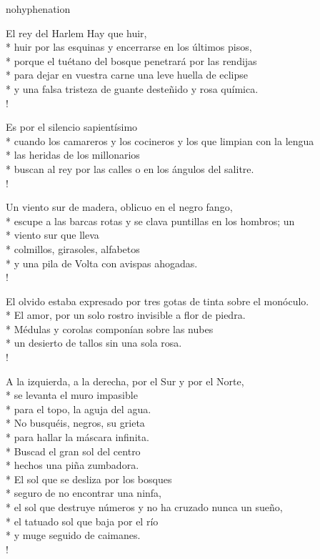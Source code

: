 \documentclass[
    a5paper,
    DIV=10,
    12pt,
    notitlepage,
    oneside,]
{scrbook} %
\begin{document}
\begin{hyphenrules}{nohyphenation}
\begin{poem}{El rey del Harlem}{}{\vspace{-1em}}
Hay que huir,\\*
huir por las esquinas y encerrarse en los últimos pisos,\\*
porque el tuétano del bosque penetrará por las rendijas\\*
para dejar en vuestra carne una leve huella de eclipse\\*
y una falsa tristeza de guante desteñido y rosa química.\\!

\ptspacer

Es por el silencio sapientísimo\\*
cuando los camareros y los cocineros y los que limpian con la lengua\\*
las heridas de los millonarios\\*
buscan al rey por las calles o en los ángulos del salitre.\\!

Un viento sur de madera, oblicuo en el negro fango,\\*
escupe a las barcas rotas y se clava puntillas en los hombros; un\\*
viento sur que lleva\\*
colmillos, girasoles, alfabetos\\*
y una pila de Volta con avispas ahogadas.\\!

El olvido estaba expresado por tres gotas de tinta sobre el monóculo.\\*
El amor, por un solo rostro invisible a flor de piedra.\\*
Médulas y corolas componían sobre las nubes\\*
un desierto de tallos sin una sola rosa.\\!

\newpage

\ptspacer

A la izquierda, a la derecha, por el Sur y por el Norte,\\*
se levanta el muro impasible\\*
para el topo, la aguja del agua.\\*
No busquéis, negros, su grieta\\*
para hallar la máscara infinita.\\*
Buscad el gran sol del centro\\*
hechos una piña zumbadora.\\*
El sol que se desliza por los bosques\\*
seguro de no encontrar una ninfa,\\*
el sol que destruye números y no ha cruzado nunca un sueño,\\*
el tatuado sol que baja por el río\\*
y muge seguido de caimanes.\\!


\end{poem}
\end{hyphenrules}
\end{document}
